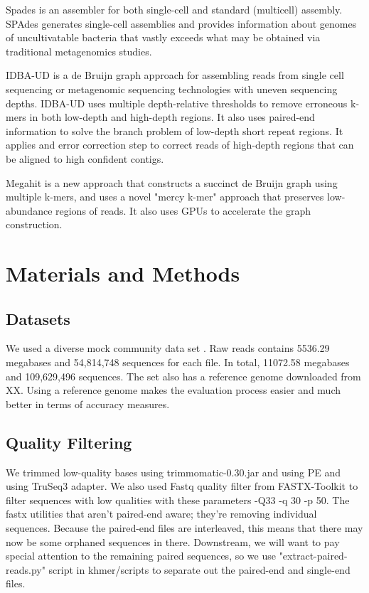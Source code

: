 Spades \cite{spades} is an assembler for both single-cell and standard (multicell) assembly. SPAdes generates single-cell assemblies and provides information about genomes of uncultivatable bacteria that vastly exceeds what may be obtained via traditional metagenomics studies. 

IDBA-UD \cite{idba} is a de Bruijn graph approach for assembling reads from single cell sequencing or metagenomic sequencing technologies with uneven sequencing depths. IDBA-UD uses multiple depth-relative thresholds to remove erroneous k-mers in both low-depth and high-depth regions. It also uses paired-end information  to solve the branch problem of low-depth short repeat regions. It applies and error correction step to correct reads of high-depth regions that can be aligned to high confident contigs.


Megahit \cite{megahit} is a new approach that constructs a succinct de Bruijn graph using multiple k-mers, and uses a novel "mercy k-mer" approach that preserves low-abundance regions of reads. It also uses GPUs to accelerate the graph construction.
 

\section*{Materials and Methods}

\subsection*{Datasets}

We used a diverse mock community data set \cite{podar}. Raw reads contains 5536.29 megabases and 54,814,748 sequences for each file. In total, 11072.58  megabases and 109,629,496 sequences. The set also has a reference genome downloaded from XX.  Using a reference genome makes the evaluation process easier and much better in terms of accuracy measures. 

\subsection*{Quality Filtering} 
We trimmed low-quality bases using trimmomatic-0.30.jar \cite {trim} and using PE and using TruSeq3  adapter.
We also used Fastq quality filter  from FASTX-Toolkit to filter sequences with low qualities with these parameters -Q33 -q 30 -p 50.
The fastx utilities that aren’t paired-end aware; they’re removing individual sequences. Because the paired-end files are interleaved, this means that there may now be some orphaned sequences in there. Downstream, we will want to pay special attention to the remaining paired sequences, so we use  "extract-paired-reads.py" script in khmer/scripts to separate out the paired-end and single-end files.

